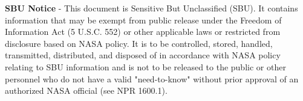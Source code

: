 \textbf{SBU Notice} - This document is Sensitive But Unclassified (SBU). It contains information that may be exempt from public release under the Freedom of Information Act (5 U.S.C. 552) or other applicable laws or restricted from disclosure based on NASA policy. It is to be controlled, stored, handled, transmitted, distributed, and disposed of in accordance with NASA policy relating to SBU information and is not to be released to the public or other personnel who do not have a valid "need-to-know" without prior approval of an authorized NASA official (see NPR 1600.1).